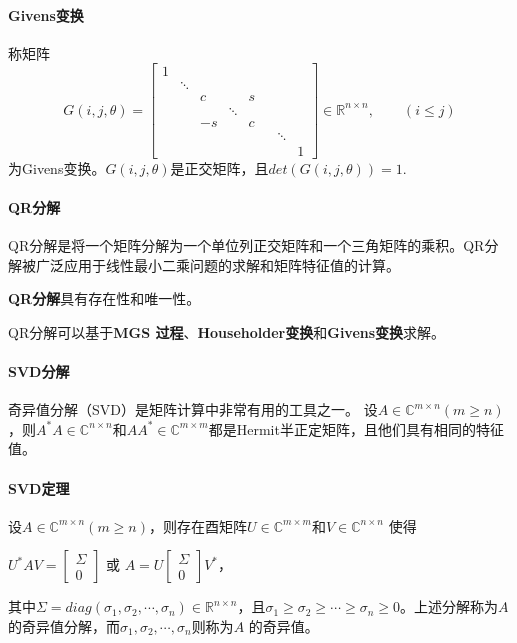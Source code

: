 \documentclass[UTF8]{article}
\begin{document}
\begin{flushleft}
\paragraph{Givens变换}
称矩阵
$$
G(i,j,\theta)=
\begin{bmatrix}
1 & & & & & \\
 & \ddots & & & & & \\
 &  & c & & s & & \\
 &  &   & \ddots &  &  & \\
 &  & -s &  & c &  & \\
 &  &   &  &  & & \ddots \\
 &  &   &  &  & & & 1
\end{bmatrix}
\in\mathbb{R}^{n \times n}, \qquad (i \leq j)
$$
为\textcolor[rgb]{0.00,0.07,1.00}{Givens变换}。$G(i,j,\theta)$是正交矩阵，且$det(G(i,j,\theta))=1$.

\paragraph{QR分解}
QR分解是将一个矩阵分解为一个\textcolor[rgb]{0.00,0.07,1.00}{单位列正交矩阵}和一个三角矩阵的乘积。QR分解被广泛应用于线性最小二乘问题的求解和矩阵特征值的计算。

\textbf{QR分解}具有\textcolor[rgb]{0.00,0.07,1.00}{存在性}和\textcolor[rgb]{0.00,0.07,1.00}{唯一性}。\vspace{1.2ex}

QR分解可以基于\textbf{\textcolor[rgb]{0.00,0.07,1.00}{MGS 过程}}、\textbf{\textcolor[rgb]{0.00,0.07,1.00}{Householder变换}}和\textbf{\textcolor[rgb]{0.00,0.07,1.00}{Givens变换}}求解。

\paragraph{SVD分解}
奇异值分解（SVD）是矩阵计算中非常有用的工具之一。
设$A\in\mathbb{C}^{m \times n}(m \geq n)$，则$A^*A\in\mathbb{C}^{n \times n}$和$AA^*\in\mathbb{C}^{m \times m}$都是Hermit半正定矩阵，且他们具有相同的特征值。

\paragraph{SVD定理}
设$A\in\mathbb{C}^{m \times n}(m \geq n)$，则存在酉矩阵$U\in\mathbb{C}^{m \times m}$和$V\in\mathbb{C}^{n \times n}$ 使得
\begin{center}
$
U^*AV=
\begin{bmatrix}
\Sigma \\
0
\end{bmatrix}
$ 或 $
A=U
\begin{bmatrix}
\Sigma \\
0
\end{bmatrix}
V^*，
$
\end{center}
其中$\Sigma = diag(\sigma_1,\sigma_2,\cdots,\sigma_n)\in \mathbb{R}^{n \times n}$，且$\sigma_1 \geq \sigma_2 \geq \cdots \geq \sigma_n \geq 0$。上述分解称为$A$的奇异值分解，而$\sigma_1,\sigma_2,\cdots,\sigma_n$则称为$A$ 的奇异值。


\end{flushleft}
\end{document}
